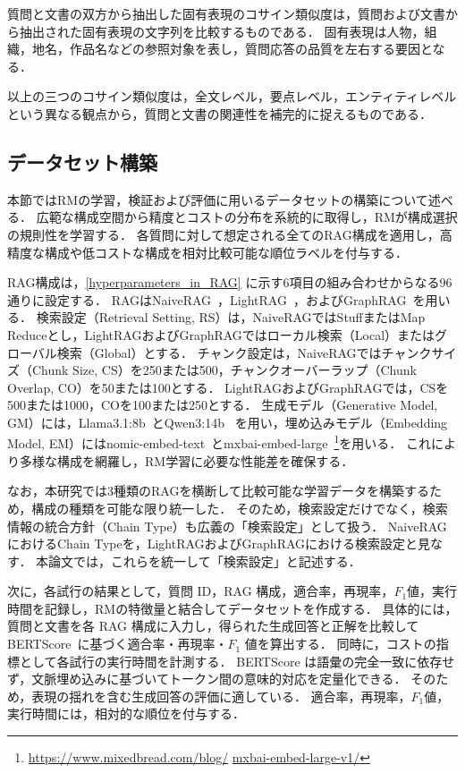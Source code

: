質問と文書の双方から抽出した固有表現のコサイン類似度は，質問および文書から抽出された固有表現の文字列を比較するものである．
固有表現は人物，組織，地名，作品名などの参照対象を表し，質問応答の品質を左右する要因となる．

以上の三つのコサイン類似度は，全文レベル，要点レベル，エンティティレベルという異なる観点から，質問と文書の関連性を補完的に捉えるものである．

\subsection{データセット構築} \label{sec3.2}
本節ではRMの学習，検証および評価に用いるデータセットの構築について述べる．
広範な構成空間から精度とコストの分布を系統的に取得し，RMが構成選択の規則性を学習する．
各質問に対して想定される全てのRAG構成を適用し，高精度な構成や低コストな構成を相対比較可能な順位ラベルを付与する．

RAG構成は，\ref{hyperparameters_in_RAG} に示す6項目の組み合わせからなる96通りに設定する．
RAGはNaiveRAG~\cite{Lewis20}，LightRAG~\cite{Guo25}，およびGraphRAG~\cite{edge25}を用いる． 
検索設定（Retrieval Setting, RS）は，NaiveRAGではStuffまたはMap Reduceとし，LightRAGおよびGraphRAGではローカル検索（Local）またはグローバル検索（Global）とする． 
チャンク設定は，NaiveRAGではチャンクサイズ（Chunk Size, CS）を250または500，チャンクオーバーラップ（Chunk Overlap, CO）を50または100とする． 
LightRAGおよびGraphRAGでは，CSを500または1000，COを100または250とする．
生成モデル（Generative Model, GM）には，Llama3.1:8b~\cite{Meta24}とQwen3:14b~\cite{qwen25} を用い，埋め込みモデル（Embedding Model, EM）にはnomic-embed-text~\cite{nussbaum25}とmxbai-embed-large~\footnote{\url{https://www.mixedbread.com/blog/} \url{mxbai-embed-large-v1/}}を用いる．
これにより多様な構成を網羅し，RM学習に必要な性能差を確保する．

なお，本研究では3種類のRAGを横断して比較可能な学習データを構築するため，構成の種類を可能な限り統一した．
そのため，検索設定だけでなく，検索情報の統合方針（Chain Type）も広義の「検索設定」として扱う．
NaiveRAGにおけるChain Typeを，LightRAGおよびGraphRAGにおける検索設定と見なす．
本論文では，これらを統一して「検索設定」と記述する．

次に，各試行の結果として，質問 ID，RAG 構成，適合率，再現率，$F_1$値，実行時間を記録し，RMの特徴量と結合してデータセットを作成する．
具体的には，質問と文書を各 RAG 構成に入力し，得られた生成回答と正解を比較して BERTScore~\cite{zhang20}に基づく適合率・再現率・$F_1$ 値を算出する．
同時に，コストの指標として各試行の実行時間を計測する．
BERTScore は語彙の完全一致に依存せず，文脈埋め込みに基づいてトークン間の意味的対応を定量化できる．
そのため，表現の揺れを含む生成回答の評価に適している．
適合率，再現率，$F_1$値，実行時間には，相対的な順位を付与する．

